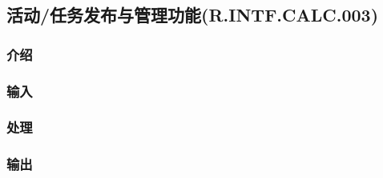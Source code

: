\subsection{活动/任务发布与管理功能(R.INTF.CALC.003)}
\subsubsection{介绍}
\subsubsection{输入}
\subsubsection{处理}
\subsubsection{输出}